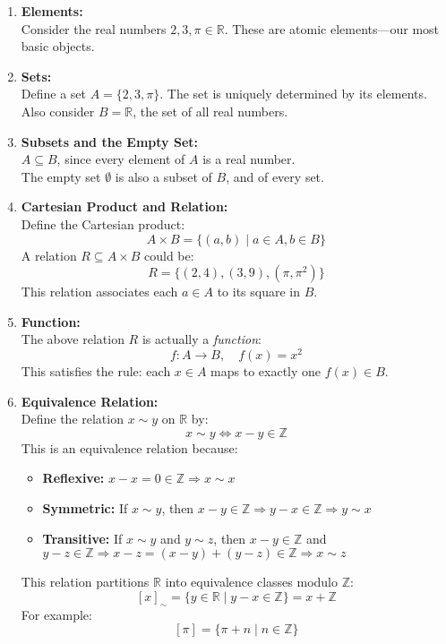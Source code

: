 \documentclass[10pt]{article}
\theoremstyle{plain}
\theoremstyle{definition}
\begin{document}
  \begin{enumerate}
  	\item \textbf{Elements:} \\
  	Consider the real numbers \( 2, 3, \pi \in \mathbb{R} \). These are atomic elements—our most basic objects.
  	
  	\item \textbf{Sets:} \\
  	Define a set \( A = \{2, 3, \pi\} \). The set is uniquely determined by its elements. \\
  	Also consider \( B = \mathbb{R} \), the set of all real numbers.
  	
  	\item \textbf{Subsets and the Empty Set:} \\
  	\( A \subseteq B \), since every element of \( A \) is a real number. \\
  	The empty set \( \emptyset \) is also a subset of \( B \), and of every set.
  	
  	\item \textbf{Cartesian Product and Relation:} \\
  	Define the Cartesian product:
  	\[
  	A \times B = \{ (a, b) \mid a \in A, b \in B \}
  	\]
  	A relation \( R \subseteq A \times B \) could be:
  	\[
  	R = \{ (2, 4), (3, 9), (\pi, \pi^2) \}
  	\]
  	This relation associates each \( a \in A \) to its square in \( B \).
  	
  	\item \textbf{Function:} \\
  	The above relation \( R \) is actually a \emph{function}:
  	\[
  	f : A \to B, \quad f(x) = x^2
  	\]
  	This satisfies the rule: each \( x \in A \) maps to exactly one \( f(x) \in B \).
  	
  	\item \textbf{Equivalence Relation:} \\
  	Define the relation \( x \sim y \) on \( \mathbb{R} \) by:
  	\[
  	x \sim y \iff x - y \in \mathbb{Z}
  	\]
  	This is an equivalence relation because:
  	\begin{itemize}
  		\item \textbf{Reflexive:} \( x - x = 0 \in \mathbb{Z} \Rightarrow x \sim x \)
  		\item \textbf{Symmetric:} If \( x \sim y \), then \( x - y \in \mathbb{Z} \Rightarrow y - x \in \mathbb{Z} \Rightarrow y \sim x \)
  		\item \textbf{Transitive:} If \( x \sim y \) and \( y \sim z \), then \( x - y \in \mathbb{Z} \) and \( y - z \in \mathbb{Z} \Rightarrow x - z = (x - y) + (y - z) \in \mathbb{Z} \Rightarrow x \sim z \)
  	\end{itemize}
  	This relation partitions \( \mathbb{R} \) into equivalence classes modulo \( \mathbb{Z} \):
  	\[
  	[x]_\sim = \{ y \in \mathbb{R} \mid y - x \in \mathbb{Z} \} = x + \mathbb{Z}
  	\]
  	For example:
  	\[
  	[\pi] = \{ \pi + n \mid n \in \mathbb{Z} \}
  	\]
  	

\end{enumerate}
\end{document}
